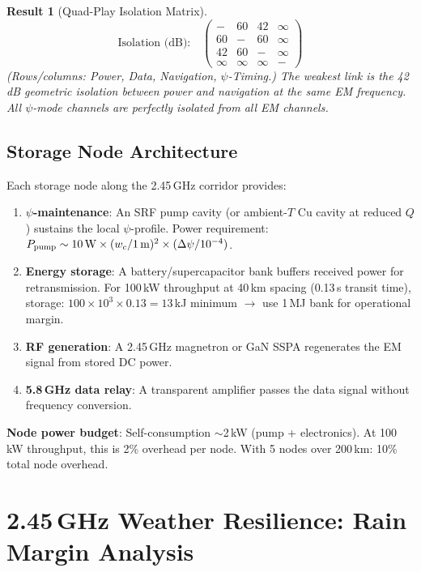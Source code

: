 \documentclass[aps,prd,twocolumn,superscriptaddress]{revtex4-2}
\newtheorem{result}{Result}
\begin{document}
\begin{result}[Quad-Play Isolation Matrix]
\begin{equation}
\boxed{
\text{Isolation (dB):}\quad
\begin{pmatrix}
- & 60 & 42 & \infty \\
60 & - & 60 & \infty \\
42 & 60 & - & \infty \\
\infty & \infty & \infty & -
\end{pmatrix}
}
\end{equation}
(Rows/columns: Power, Data, Navigation, $\psi$-Timing.)
The weakest link is the 42\,dB geometric isolation between power
and navigation at the same EM frequency. All $\psi$-mode channels
are perfectly isolated from all EM channels.
\end{result}

\subsection{Storage Node Architecture}

Each storage node along the 2.45\,GHz corridor provides:

\begin{enumerate}
\item \textbf{$\psi$-maintenance}: An SRF pump cavity (or ambient-$T$
Cu cavity at reduced $Q$) sustains the local $\psi$-profile. Power
requirement: $P_{\rm pump} \sim 10\,\text{W}\times(w_c/1\,\text{m})^2
\times(\Delta\psi/10^{-4})$.
\item \textbf{Energy storage}: A battery/supercapacitor bank buffers
received power for retransmission. For 100\,kW throughput at 40\,km
spacing (0.13\,s transit time), storage: $100\times10^3\times0.13
= 13$\,kJ minimum $\to$ use 1\,MJ bank for operational margin.
\item \textbf{RF generation}: A 2.45\,GHz magnetron or GaN SSPA
regenerates the EM signal from stored DC power.
\item \textbf{5.8\,GHz data relay}: A transparent amplifier passes
the data signal without frequency conversion.
\end{enumerate}

\textbf{Node power budget}: Self-consumption $\sim$2\,kW (pump + electronics).
At 100\,kW throughput, this is 2\% overhead per node.  With 5 nodes
over 200\,km: 10\% total node overhead.


\section{2.45\,GHz Weather Resilience: Rain Margin Analysis}
\label{sec:rain-245}
\end{document}
